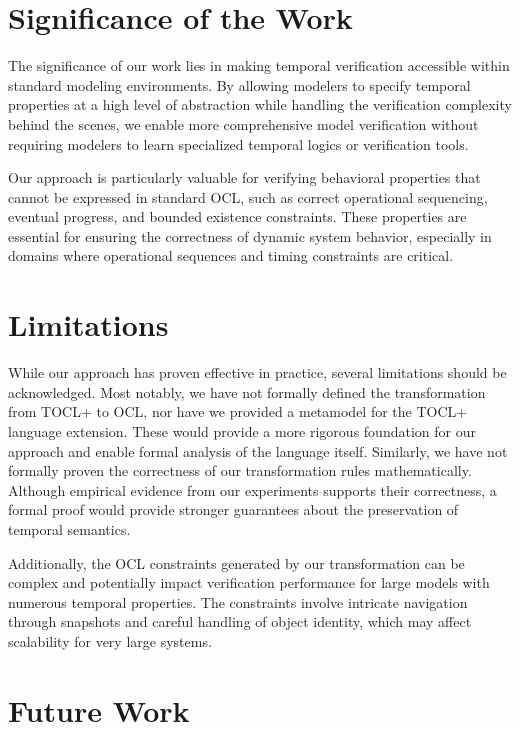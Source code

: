 \section*{Significance of the Work}

The significance of our work lies in making temporal verification accessible within 
standard modeling environments. By allowing modelers to specify temporal properties 
at a high level of abstraction while handling the verification complexity behind 
the scenes, we enable more comprehensive model verification without requiring 
modelers to learn specialized temporal logics or verification tools.

Our approach is particularly valuable for verifying behavioral properties that cannot 
be expressed in standard OCL, such as correct operational sequencing, eventual 
progress, and bounded existence constraints. These properties are essential for 
ensuring the correctness of dynamic system behavior, especially in domains where 
operational sequences and timing constraints are critical.

\section*{Limitations}

While our approach has proven effective in practice, several limitations should be 
acknowledged. Most notably, we have not formally defined the transformation from TOCL+ to OCL, 
nor have we provided a metamodel for the TOCL+ language extension. These would provide 
a more rigorous foundation for our approach and enable formal analysis of the language itself.
Similarly, we have not formally proven the correctness of our 
transformation rules mathematically. Although empirical evidence from our experiments 
supports their correctness, a formal proof would provide stronger guarantees about 
the preservation of temporal semantics.

Additionally, the OCL constraints generated by our transformation can be complex 
and potentially impact verification performance for large models with numerous 
temporal properties. The constraints involve intricate navigation through snapshots 
and careful handling of object identity, which may affect scalability for very large 
systems.

\section*{Future Work}

